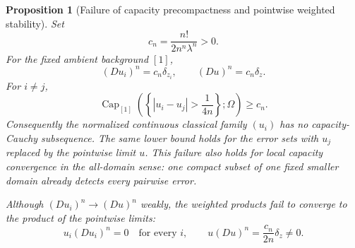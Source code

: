 \documentclass[11pt,a4paper]{article}
\numberwithin{equation}{section}
\newtheorem{proposition}[theorem]{Proposition}
\theoremstyle{definition}
\theoremstyle{remark}
\begin{document}
\begin{proposition}[Failure of capacity precompactness and pointwise
weighted stability]
\label{prop:r2-capacity-noncompactness}
Set
\[
 c_n=\frac{n!}{2n^n\lambda^n}>0.
\]
For the fixed ambient background $[1]$,
\[
 (Du_i)^n=c_n\delta_{z_i},\qquad
 (Du)^n=c_n\delta_z.
\]
For $i\ne j$,
\[
 \operatorname{Cap}_{[1]}
    \left(\left\{|u_i-u_j|>\frac1{4n}\right\};\Omega\right)
       \geq c_n.
\]
Consequently the normalized continuous classical family
$(u_i)$ has no capacity-Cauchy subsequence. The same lower
bound holds for the error sets with $u_j$ replaced by the
pointwise limit $u$.
This failure also holds for local capacity convergence in the
all-domain sense: one compact subset of one fixed smaller
domain already detects every pairwise error.

Although $(Du_i)^n\to(Du)^n$ weakly, the weighted products fail
to converge to the product of the pointwise limits:
\[
 u_i(Du_i)^n=0\quad\text{for every }i,\qquad
 u(Du)^n=\frac{c_n}{2n}\delta_z\ne0.
\]
\end{proposition}
\end{document}
